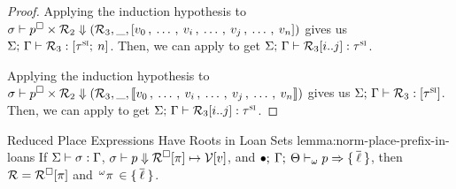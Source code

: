 \begin{proof}
  \vspace{1em}
  \noindent \framebox[\textwidth]{
    \figuresize
    \begin{mathpar}
      \PDerefSlicePtrArray \and \WFRefSliceArray
    \end{mathpar}
  }
  \vspace{1em}

  Applying the induction hypothesis to
  $ \sigma \vdash p^\square \times \mathcal{R}_2 \Downarrow (\mathcal{R}_3, \_, 
    [
      v_0 \, , \: \ldots \, , \: v_i \, , \: \ldots \, , \: v_j \, , \: \ldots \, , \: v_n
    ]
  ) $ gives us $\Sigma; \, \Gamma \vdash \mathcal{R}_3 : 
    [\tau^\textsc{si} ; \: n]
  $. Then, we can apply  to get
  $\Sigma; \, \Gamma \vdash \mathcal{R}_3 [ i .. j ] : 
    \tau^\textsc{si}
  $.

  \vspace{1em}
  \noindent \framebox[\textwidth]{
    \figuresize
    \begin{mathpar}
      \PDerefSlicePtrSlice \and \WFRefSliceSlice
    \end{mathpar}
  }
  \vspace{1em}

  Applying the induction hypothesis to
  $ \sigma \vdash p^\square \times \mathcal{R}_2 \Downarrow (\mathcal{R}_3, \_, 
    \llbracket 
      v_0 \, , \: \ldots \, , \: v_i \, , \: \ldots \, , \: v_j \, , \: \ldots \, , \: v_n
     \rrbracket
  ) $ gives us $\Sigma; \, \Gamma \vdash \mathcal{R}_3 : 
    [\tau^\textsc{si}]
  $. Then, we can apply  to get
  $\Sigma; \, \Gamma \vdash \mathcal{R}_3 [ i .. j ] : 
    \tau^\textsc{si}
  $.
\end{proof}

\begin{oxlemma}{Reduced Place Expressions Have Roots in Loan Sets}
  {lemma:norm-place-prefix-in-loans}
  If $\Sigma \vdash \sigma : \Gamma$,
  $ \sigma \vdash p \Downarrow \mathcal{R}^\square[\pi] \mapsto \mathcal{V} [v] $, and
  $\bullet; \: \Gamma; \: \Theta \vdash_{\omega} p \Rightarrow 
    \{ \: \overline{\ell} \: \}
  $, then $\mathcal{R} = \mathcal{R}^\square[\pi]$ and
  $\,^{\omega}\pi\, \in \{ \: \overline{\ell} \: \}$.
\end{oxlemma}

